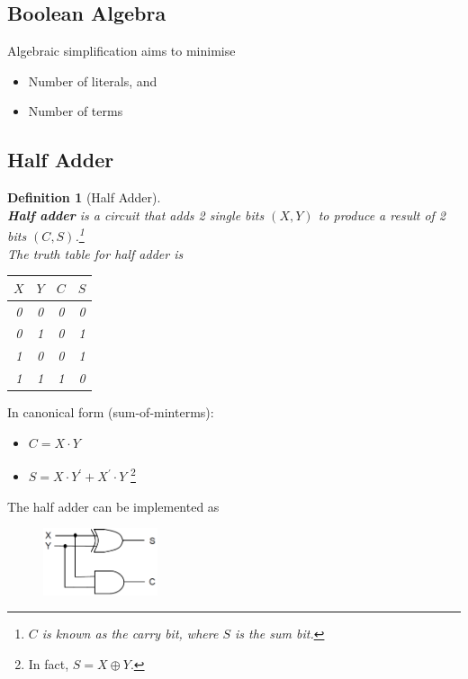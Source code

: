 \documentclass[12pt]{article}
\newtheorem{definition}{Definition}[section]
\theoremstyle{definition}
\begin{document}
\subsection{Boolean Algebra}
Algebraic simplification aims to minimise
\begin{itemize}
\item Number of literals, and
\item Number of terms
\end{itemize}
\subsection{Half Adder}
\begin{definition}[Half Adder]
\hfill\\\normalfont \textbf{Half adder} is a circuit that adds 2 single bits $(X,Y)$ to produce a result of 2 bits $(C,S)$.\footnote{$C$ is known as the carry bit, where $S$ is the sum bit.}\\
The truth table for half adder is
\begin{table}[h]
\centering
\begin{tabular}{|c|c||c|c|}
\hline
$X$ & $Y$ & $C$ &  $S$
\\\hline
0 & 0 & 0 & 0
\\\hline
0 & 1 & 0 & 1
\\\hline
1 & 0 & 0 & 1
\\\hline
1 & 1 & 1 & 0
\\\hline
\end{tabular}
\end{table}
\end{definition}
In canonical form (sum-of-minterms): 
\begin{itemize}
  \item $C=X\cdot Y$
  \item $S=X\cdot Y^\prime +X^\prime \cdot Y$ \footnote{In fact, $S=X\oplus Y$.}
\end{itemize}
The half adder can be implemented as 
\begin{figure}[h]\centering\includegraphics[width=0.3\textwidth]{4_11.png}\end{figure}
\clearpage
\end{document}

